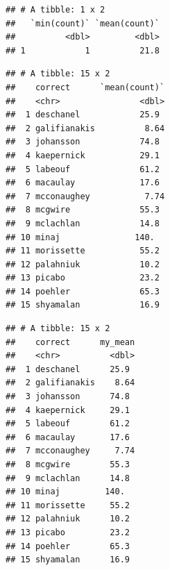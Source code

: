 \documentclass[
]{book}
\newenvironment{Shaded}{\begin{snugshade}}{\end{snugshade}}
\newcommand{\DataTypeTok}[1]{\textcolor[rgb]{0.13,0.29,0.53}{#1}}
\newcommand{\KeywordTok}[1]{\textcolor[rgb]{0.13,0.29,0.53}{\textbf{#1}}}
\newcommand{\NormalTok}[1]{#1}
\newcommand{\OperatorTok}[1]{\textcolor[rgb]{0.81,0.36,0.00}{\textbf{#1}}}
\newcommand{\StringTok}[1]{\textcolor[rgb]{0.31,0.60,0.02}{#1}}
\begin{document}
\begin{verbatim}
## # A tibble: 1 x 2
##   `min(count)` `mean(count)`
##          <dbl>         <dbl>
## 1            1          21.8
\end{verbatim}

\begin{Shaded}
\end{Shaded}

\begin{verbatim}
## # A tibble: 15 x 2
##    correct      `mean(count)`
##    <chr>                <dbl>
##  1 deschanel            25.9 
##  2 galifianakis          8.64
##  3 johansson            74.8 
##  4 kaepernick           29.1 
##  5 labeouf              61.2 
##  6 macaulay             17.6 
##  7 mcconaughey           7.74
##  8 mcgwire              55.3 
##  9 mclachlan            14.8 
## 10 minaj               140.  
## 11 morissette           55.2 
## 12 palahniuk            10.2 
## 13 picabo               23.2 
## 14 poehler              65.3 
## 15 shyamalan            16.9
\end{verbatim}

\begin{Shaded}
\end{Shaded}

\begin{verbatim}
## # A tibble: 15 x 2
##    correct      my_mean
##    <chr>          <dbl>
##  1 deschanel      25.9 
##  2 galifianakis    8.64
##  3 johansson      74.8 
##  4 kaepernick     29.1 
##  5 labeouf        61.2 
##  6 macaulay       17.6 
##  7 mcconaughey     7.74
##  8 mcgwire        55.3 
##  9 mclachlan      14.8 
## 10 minaj         140.  
## 11 morissette     55.2 
## 12 palahniuk      10.2 
## 13 picabo         23.2 
## 14 poehler        65.3 
## 15 shyamalan      16.9
\end{verbatim}
\end{document}
